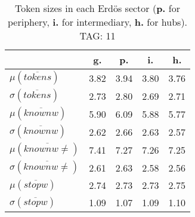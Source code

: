 \begin{table}[h!]
\begin{center}
\begin{tabular}{| l || c | c | c | c |}\hline
 & {\bf g.} & {\bf p.} & {\bf i.} & {\bf h.} \\\hline\hline
$\mu(\overline{tokens})$ & 3.82  & 3.94  & 3.80  & 3.76 \\
$\sigma(\overline{tokens})$ & 2.73  & 2.80  & 2.69  & 2.71 \\\hline
$\mu(\overline{knownw})$ & 5.90  & 6.09  & 5.88  & 5.77 \\
$\sigma(\overline{knownw})$ & 2.62  & 2.66  & 2.63  & 2.57 \\\hline
$\mu(\overline{knownw \neq})$ & 7.41  & 7.27  & 7.26  & 7.25 \\
$\sigma(\overline{knownw \neq})$ & 2.61  & 2.63  & 2.58  & 2.56 \\\hline
$\mu(\overline{stopw})$ & 2.74  & 2.73  & 2.73  & 2.75 \\
$\sigma(\overline{stopw})$ & 1.09  & 1.07  & 1.09  & 1.10 \\\hline
\end{tabular}
\caption{Token sizes in each Erd\"os sector ({{\bf p.}} for periphery, {{\bf i.}} for intermediary, {{\bf h.}} for hubs). TAG: 11}
\end{center}
\end{table}